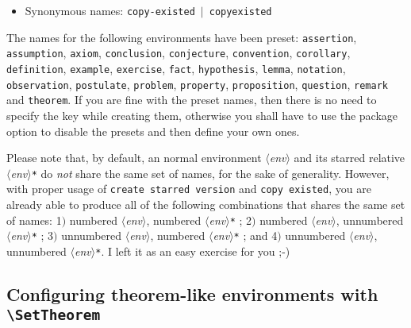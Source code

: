 \documentclass[classical]{einfart}
\newcommand{\meta}[1]{$\langle${\normalfont\itshape#1}$\rangle$}
\newcommand{\packageoption}[1]{\texttt{\textcolor{code-option}{#1}}}
\newcommand{\commandoption}[1]{\texttt{\textcolor{code-keys}{#1}}}
\newenvironment{tip}[1][Tip]
  {%
    \LocallyStopLineNumbers%
    \begin{tcolorbox}[breakable,
        enhanced,
        width = \textwidth,
        colback = paper, colbacktitle = paper,
        colframe = gray!50, boxrule=0.2mm,
        coltitle = black,
        fonttitle = \sffamily,
        attach boxed title to top left = {yshift=-\tcboxedtitleheight/2, xshift=.5cm},
        boxed title style = {boxrule=0pt, colframe=paper},
        before skip = 3mm,
        after skip = 3mm,
        top = 2.5mm,
        bottom = 1.5mm,
        title={\scshape\sffamily #1}]%
  }
  {%
    \end{tcolorbox}%
    \ResumeLineNumbers%
  }
\begin{document}
\begin{itemize}[label=,leftmargin=1.25em,itemindent=-1.25em]
\begin{itemize}
\begin{enumerate}
                    \item To remove the numbering of some environments. For example, one can remove the numbering of the \texttt{remark} environment with \lstinline|\CreateTheorem{remark}{|\commandoption{copy existed} \lstinline|= remark*}|.
                \end{enumerate}
            \item Synonymous names: \commandoption{copy-existed} \,$|$\, \commandoption{copyexisted}
        \end{itemize}
\end{itemize}

\begin{tip}
    The names for the following environments have been preset: \texttt{assertion}, \texttt{assumption}, \texttt{axiom}, \texttt{conclusion}, \texttt{conjecture}, \texttt{convention}, \texttt{corollary}, \texttt{definition}, \texttt{example}, \texttt{exercise}, \texttt{fact}, \texttt{hypothesis}, \texttt{lemma}, \texttt{notation}, \texttt{observation}, \texttt{postulate}, \texttt{problem}, \texttt{property}, \texttt{proposition}, \texttt{question}, \texttt{remark} and \texttt{theorem}. If you are fine with the preset names, then there is no need to specify the key \textquote{\commandoption{name}} while creating them, otherwise you shall have to use the package option \textquote{\packageoption{no preset names}} to disable the presets and then define your own ones.
\end{tip}

\medskip

Please note that, by default, an normal environment \meta{env} and its starred relative \meta{env}\texttt{*} do \emph{not} share the same set of names, for the sake of generality. However, with proper usage of \commandoption{create starred version} and \commandoption{copy existed}, you are already able to produce all of the following combinations that shares the same set of names: 1$)$ numbered \meta{env}, numbered \meta{env}\texttt{*} ; 2$)$ numbered \meta{env}, unnumbered \meta{env}\texttt{*} ; 3$)$ unnumbered \meta{env}, numbered \meta{env}\texttt{*} ; and 4$)$ unnumbered \meta{env}, unnumbered \meta{env}\texttt{*}. I left it as an easy exercise for you ;-)


\bigskip
\subsection[Configuring theorem-like environments]{Configuring theorem-like environments with \texttt{\textbackslash\textcolor{code-main}{SetTheorem}}}
\end{document}
